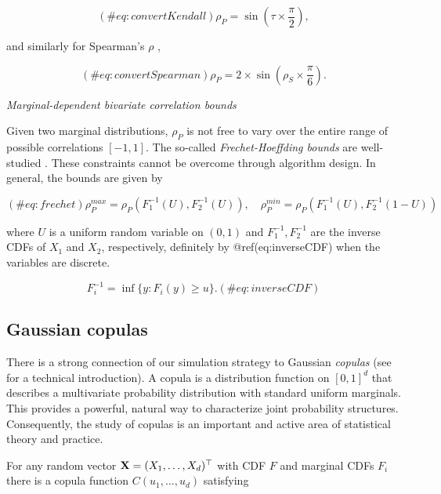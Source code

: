\documentclass[
]{jss}
\begin{document}
\begin{equation}
(\#eq:convertKendall)
\rho_{P} = \sin \left( \tau \times \frac{\pi}{2} \right), 
\end{equation}

\noindent and similarly for Spearman's \(\rho\) \citep{K58},

\begin{equation}
(\#eq:convertSpearman)
\rho_P = 2 \times \sin \left( \rho_S \times \frac{\pi}{6} \right).
\end{equation}

\emph{Marginal-dependent bivariate correlation bounds}

Given two marginal distributions, \(\rho_P\) is not free to vary over
the entire range of possible correlations \([-1,1]\). The so-called
\emph{Frechet-Hoeffding bounds} are well-studied
\citep{Nelsen2007, BF17}. These constraints cannot be overcome through
algorithm design. In general, the bounds are given by

\begin{equation}
(\#eq:frechet)
\rho_P^{max} = \rho_P \left( F^{-1}_1 (U), F^{-1}_2 (U) \right), \quad \rho_P^{min} = \rho_P \left( F^{-1}_1 (U), F^{-1}_2 (1 - U) \right)
\end{equation}

\noindent where \(U\) is a uniform random variable on \((0,1)\) and
\(F^{-1}_1, F^{-1}_2\) are the inverse CDFs of \(X_1\) and \(X_2\),
respectively, definitely by @ref(eq:inverseCDF) when the variables are
discrete.

\begin{equation}
F_{i}^{-1} = \inf\{y:F_{i}(y) \geq u \}.
(\#eq:inverseCDF)
\end{equation}

\hypertarget{gaussian-copulas}{%
\subsection{Gaussian copulas}\label{gaussian-copulas}}

There is a strong connection of our simulation strategy to Gaussian
\emph{copulas} (see \citet{Nelsen2007} for a technical introduction). A
copula is a distribution function on \([0,1]^d\) that describes a
multivariate probability distribution with standard uniform marginals.
This provides a powerful, natural way to characterize joint probability
structures. Consequently, the study of copulas is an important and
active area of statistical theory and practice.

For any random vector \({\bf X}=(X_1, \ldots, X_d)^\top\) with CDF \(F\)
and marginal CDFs \(F_i\) there is a copula function
\(C(u_1, \ldots, u_d)\) satisfying
\end{document}
